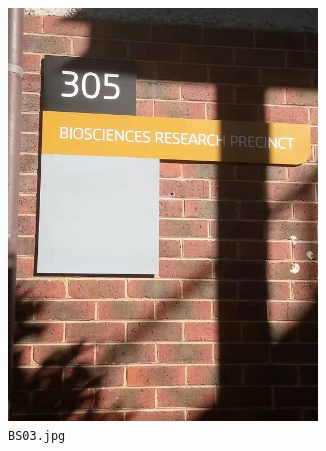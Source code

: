 \documentclass{article}
\begin{document}
\begin{figure}[h]
  \centering
  \begin{subfigure}[h]{0.22\textwidth}
    \centering
    \includegraphics[width=0.9\textwidth]{../train/task1/BS03}
    \caption[BS03]{
      \lstinline{BS03.jpg}
    }
    \label{fig:bs03}
  \end{subfigure}
  \begin{subfigure}[h]{0.22\textwidth}
    \centering

\end{subfigure}
\end{figure}
\end{document}
